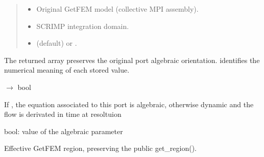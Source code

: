 \documentclass[letterpaper,10pt,english]{sphinxmanual}
\begin{document}
\begin{fulllineitems}
\begin{fulllineitems}
\begin{quote}
\begin{description}
\begin{itemize}
\item {} 
\sphinxAtStartPar
{} \textendash{} Original GetFEM model (collective MPI assembly).

\item {} 
\sphinxAtStartPar
{} \textendash{} SCRIMP integration domain.

\item {} 
\sphinxAtStartPar
{} \textendash{}  (default) or .

\end{itemize}

\end{description}\end{quote}

\sphinxAtStartPar
The returned  array preserves the original port
algebraic orientation.  identifies the
numerical meaning of each stored value.

\end{fulllineitems}


\begin{fulllineitems}
\label{\detokenize{scrimp:scrimp.port.Port.get_algebraic}}
\pysigstartsignatures
\pysiglinewithargsret
{}
{}
{{ $\rightarrow$ bool}}
\pysigstopsignatures\begin{description}
\sphinxAtStartPar
If , the equation associated to this port is algebraic, otherwise dynamic and the flow is derivated in time at resoltuion

\sphinxAtStartPar
bool: value of the algebraic parameter

\end{description}

\end{fulllineitems}


\begin{fulllineitems}
\label{\detokenize{scrimp:scrimp.port.Port.get_assembly_region}}
\pysigstartsignatures
\pysiglinewithargsret
{}
{}
{}
\pysigstopsignatures
\sphinxAtStartPar
Effective GetFEM region, preserving the public get\_region().


\end{fulllineitems}
\end{fulllineitems}
\end{document}

